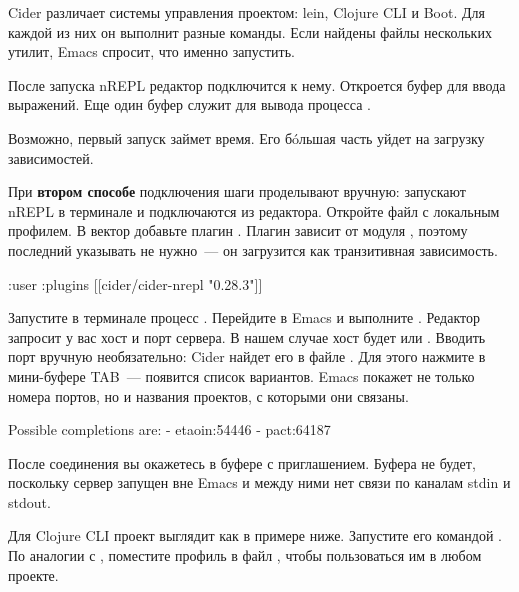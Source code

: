 Cider различает системы управления проектом: lein, Clojure CLI и Boot. Для каждой из них он выполнит разные команды. Если найдены файлы нескольких утилит, Emacs спросит, что именно запустить.

После запуска nREPL редактор подключится к нему. Откроется буфер  для ввода выражений. Еще один буфер  служит для вывода процесса .

Возможно, первый запуск  займет время. Его бóльшая часть уйдет на загрузку зависимостей.

При \textbf{втором способе} подключения шаги проделывают вручную: запускают nREPL в терминале и подключаются из редактора. Откройте файл  с локальным профилем. В вектор  \arr {} добавьте плагин . Плагин зависит от модуля , поэтому последний указывать не нужно~--- он загрузится как транзитивная зависимость.

\begin{english}
  \begin{clojure}
{:user
 {:plugins
  [[cider/cider-nrepl "0.28.3"]]}}
  \end{clojure}
\end{english}

Запустите в терминале процесс . Перейдите в Emacs и выполните . Редактор запросит у вас хост и порт сервера. В нашем случае хост будет  или . Вводить порт вручную необязательно: Cider найдет его в файле . Для этого нажмите в мини-буфере TAB~--- появится список вариантов. Emacs покажет не только номера портов, но и названия проектов, с которыми они связаны.

\begin{english}
  \begin{text}
Possible completions are:
- etaoin:54446
- pact:64187
  \end{text}
\end{english}

После соединения вы окажетесь в буфере  с приглашением. Буфера  не будет, поскольку сервер запущен вне Emacs и между ними нет связи по каналам stdin и stdout.

Для Clojure CLI проект выглядит как в примере ниже. Запустите его командой . По аналогии с , поместите профиль  в файл , чтобы пользоваться им в любом проекте.

